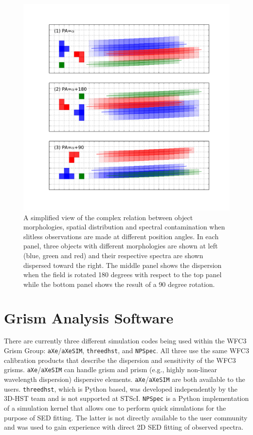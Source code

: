\documentclass[preprint]{aastex}
\begin{document}
\begin{figure}[!ht]
\centering
\includegraphics[width=5.5in]{"Figures/contam_sim"}
\caption{A simplified view of the complex relation between object morphologies, spatial distribution and spectral contamination when slitless observations are made at different position angles. In each panel, three objects with different morphologies are shown at left (blue, green and red) and their respective spectra are shown dispersed toward the right. The middle panel shows the dispersion when the field is rotated 180 degrees with respect to the top panel while the bottom panel shows the result of a 90 degree rotation.}
\label{fig:2}
\end{figure}

\section{Grism Analysis Software}

There are currently three different simulation codes being used within the WFC3 Grism Group:  \texttt{aXe}/\texttt{aXeSIM}, \texttt{threedhst}, and \texttt{NPSpec}. All three use the same WFC3 calibration products that describe the dispersion and sensitivity of the WFC3 grisms. \texttt{aXe}/\texttt{aXeSIM} can handle grism and prism (e.g., highly non-linear wavelength dispersion) dispersive elements. \texttt{aXe}/\texttt{aXeSIM} are both available to the users. \texttt{threedhst}, which is Python based, was developed independently by the 3D-HST team and is not supported at STScI. \texttt{NPSpec} is a Python implementation of a simulation kernel that allows one to perform quick simulations for the purpose of SED fitting. The latter is not directly available to the user community and was used to gain experience with direct 2D SED fitting of observed spectra.
\end{document}
